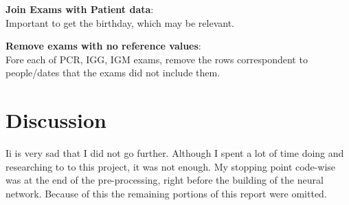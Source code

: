 \documentclass[]{article}
\begin{document}
\begin{description}
	\item \textbf{Join Exams with Patient data}:\\
	Important to get the birthday, which may be relevant.\\
	
	\item \textbf{Remove exams with no reference values}:\\
	Fore each of PCR, IGG, IGM exams, remove the rows correspondent to people/dates that the exams did not include them.

	
\end{description}

\section{Discussion}

Ii is very sad that I did not go further. Although I spent a lot of time doing and researching to to this project, it was not enough. My stopping point code-wise was at the end of the pre-processing, right before the building of the neural network. Because of this the remaining portions of this report were omitted.
\end{document}
